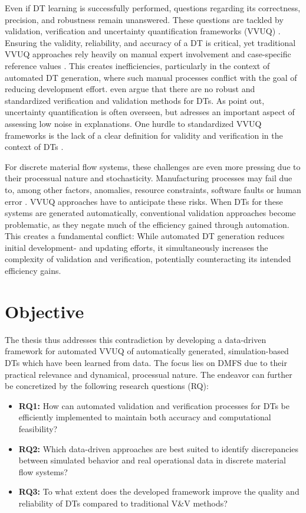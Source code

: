 Even if DT learning is successfully performed, questions regarding its correctness, precision, and robustness remain unanswered. These questions are tackled by validation, verification and uncertainty quantification frameworks (VVUQ) \parencite{sel2025survey}. Ensuring the validity, reliability, and accuracy of a DT is critical, yet traditional VVUQ approaches rely heavily on manual expert involvement and case-specific reference values \parencite{Bitencourt2023,hua2022validation}. This creates inefficiencies, particularly in the context of automated DT generation, where such manual processes conflict with the goal of reducing development effort. \citeauthor{hua2022validation} even argue that there are no robust and standardized verification and validation methods for DTs. As \autocite{sel2025survey} point out, uncertainty quantification is often overseen, but adresses an important aspect of assessing low noise in explanations. One hurdle to standardized VVUQ frameworks is the lack of a clear definition for validity and verification in the context of DTs \parencite{Bitencourt2023}.

For discrete material flow systems, these challenges are even more pressing due to their processual nature and stochasticity. Manufacturing processes may fail due to, among other factors, anomalies, resource constraints, software faults or human error \parencite{chenganomalies}. VVUQ approaches have to anticipate these risks. When DTs for these systems are generated automatically, conventional validation approaches become problematic, as they negate much of the efficiency gained through automation. This creates a fundamental conflict: While automated DT generation reduces initial development- and updating efforts, it simultaneously increases the complexity of validation and verification, potentially counteracting its intended efficiency gains.

\section{Objective}

The thesis thus addresses this contradiction by developing a data-driven framework for automated VVUQ of automatically generated, simulation-based DTs which have been learned from data. The focus lies on DMFS due to their practical relevance and dynamical, processual nature. The endeavor can further be concretized by the following research questions (RQ):

\begin{itemize}
  \item \textbf{RQ1:} How can automated validation and verification processes for DTs be efficiently implemented to maintain both accuracy and computational feasibility?
  \item \textbf{RQ2:} Which data-driven approaches are best suited to identify discrepancies between simulated behavior and real operational data in discrete material flow systems?
  \item \textbf{RQ3:} To what extent does the developed framework improve the quality and reliability of DTs compared to traditional V&V methods?
\end{itemize}


